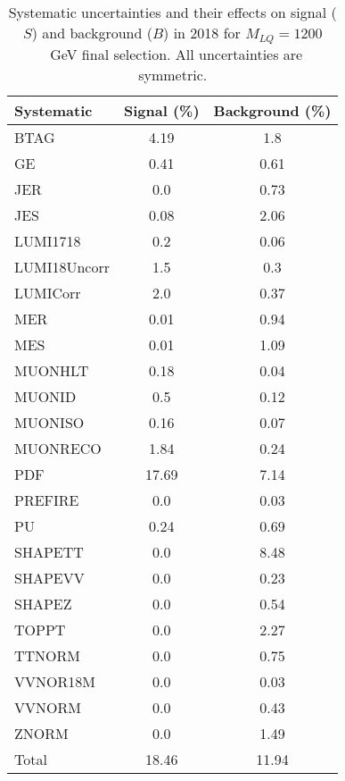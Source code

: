 \begin{table}[htbp]
\begin{center}
\caption{Systematic uncertainties and their effects on signal ($S$) and background ($B$) in 2018 for $M_{LQ}=1200$~GeV final selection. All uncertainties are symmetric.}
\begin{tabular}{lcc}
\hline\hline
Systematic & Signal (\%) & Background (\%) \\ \hline 
BTAG & 4.19 & 1.8\\ 
GE & 0.41 & 0.61\\ 
JER & 0.0 & 0.73\\ 
JES & 0.08 & 2.06\\ 
LUMI1718 & 0.2 & 0.06\\ 
LUMI18Uncorr & 1.5 & 0.3\\ 
LUMICorr & 2.0 & 0.37\\ 
MER & 0.01 & 0.94\\ 
MES & 0.01 & 1.09\\ 
MUONHLT & 0.18 & 0.04\\ 
MUONID & 0.5 & 0.12\\ 
MUONISO & 0.16 & 0.07\\ 
MUONRECO & 1.84 & 0.24\\ 
PDF & 17.69 & 7.14\\ 
PREFIRE & 0.0 & 0.03\\ 
PU & 0.24 & 0.69\\ 
SHAPETT & 0.0 & 8.48\\ 
SHAPEVV & 0.0 & 0.23\\ 
SHAPEZ & 0.0 & 0.54\\ 
TOPPT & 0.0 & 2.27\\ 
TTNORM & 0.0 & 0.75\\ 
VVNOR18M & 0.0 & 0.03\\ 
VVNORM & 0.0 & 0.43\\ 
ZNORM & 0.0 & 1.49\\ 
Total & 18.46 & 11.94\\ \hline \hline
\end{tabular}
\label{tab:SysUncertainties_uujj_1200}
\end{center}
\end{table}

